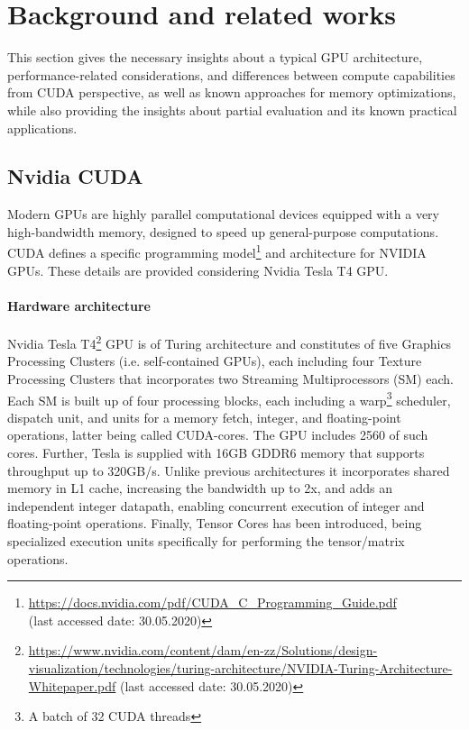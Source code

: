 \section{Background and related works}
This section gives the necessary insights about a typical GPU architecture,
 performance-related considerations, and differences between compute capabilities
  from CUDA perspective, as well as known approaches for memory optimizations, 
  while also providing the insights about partial evaluation and its known practical 
  applications.
\subsection{Nvidia CUDA}
Modern GPUs are highly parallel computational 
devices equipped with a very high-bandwidth memory, 
designed to speed up general-purpose computations. 
CUDA defines a specific programming model\footnote{\url{https://docs.nvidia.com/pdf/CUDA_C_Programming_Guide.pdf} \\
 (last accessed date: 30.05.2020)} and architecture 
 for NVIDIA GPUs. These details are provided considering Nvidia Tesla T4 GPU.
\paragraph*{Hardware architecture}
Nvidia Tesla T4\footnote{\url{https://www.nvidia.com/content/dam/en-zz/Solutions/design-visualization/technologies/turing-architecture/NVIDIA-Turing-Architecture-Whitepaper.pdf} 
(last accessed date: 30.05.2020)} GPU is of Turing architecture and constitutes of five Graphics Processing Clusters (i.e. self-contained GPUs), each including four Texture Processing
 Clusters that incorporates two Streaming Multiprocessors (SM) each. Each SM is built up of four processing blocks, each including a warp\footnote{A batch of 32 CUDA threads} scheduler, 
 dispatch unit, and units for a memory fetch, integer, and floating-point operations, latter being called CUDA-cores. The GPU includes 2560 of such cores. Further, Tesla is supplied with 16GB GDDR6 
 memory that supports throughput up to 320GB/s. Unlike previous architectures it incorporates shared memory in L1 cache, increasing the bandwidth up to 2x, and adds an independent integer datapath, 
 enabling concurrent execution of integer and floating-point operations. Finally, Tensor Cores has been introduced, being specialized execution units specifically for performing the tensor/matrix operations.

